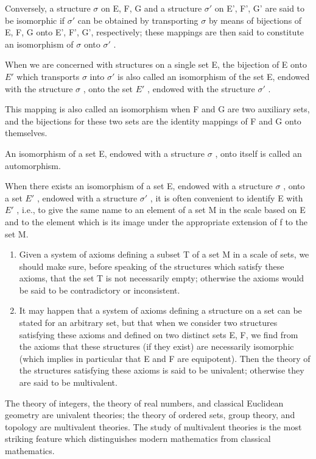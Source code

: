 Conversely, a structure \(\sigma\) on E, F, G and a structure \(\sigma'\) on E', F', G' are said to be isomorphic if \(\sigma'\) can be obtained by transporting \(\sigma\) by means of bijections of E, F, G onto E', F', G', respectively; these mappings are then said to constitute an isomorphism of \(\sigma\) onto \(\sigma'\) .

When we are concerned with structures on a single set E, the bijection of E onto \(E'\) which transports \(\sigma\) into \(\sigma'\) is also called an isomorphism of the set E, endowed with the structure \(\sigma\) , onto the set \(E'\) , endowed with the structure \(\sigma'\) .

This mapping is also called an isomorphism when F and G are two auxiliary sets, and the bijections for these two sets are the identity mappings of F and G onto themselves.

An isomorphism of a set E, endowed with a structure \(\sigma\) , onto itself is called an automorphism.

When there exists an isomorphism of a set E, endowed with a structure \(\sigma\) , onto a set \(E'\) , endowed with a structure \(\sigma'\) , it is often convenient to identify E with \(E'\) , i.e., to give the same name to an element of a set M in the scale based on E and to the element which is its image under the appropriate extension of f to the set M.

\begin{enumerate}
\def\labelenumi{\arabic{enumi}.}
\setcounter{enumi}{5}
\item
  Given a system of axioms defining a subset T of a set M in a scale of sets, we should make sure, before speaking of the structures which satisfy these axioms, that the set T is not necessarily empty; otherwise the axioms would be said to be contradictory or inconsistent.
\item
  It may happen that a system of axioms defining a structure on a set can be stated for an arbitrary set, but that when we consider two structures satisfying these axioms and defined on two distinct sets E, F, we find from the axioms that these structures (if they exist) are necessarily isomorphic (which implies in particular that E and F are equipotent). Then the theory of the structures satisfying these axioms is said to be univalent; otherwise they are said to be multivalent.
\end{enumerate}

The theory of integers, the theory of real numbers, and classical Euclidean geometry are univalent theories; the theory of ordered sets, group theory, and topology are multivalent theories. The study of multivalent theories is the most striking feature which distinguishes modern mathematics from classical mathematics.

